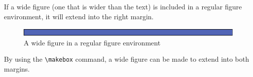 \documentclass{article}
\begin{document}
\Large
If a wide figure (one that is wider than the text) is included in a regular figure environment, it will extend into the right margin.
\begin{figure}[htbp]
  \includegraphics[width=1.2\textwidth]{box.pdf}
  \caption{A wide figure in a regular figure environment}
\end{figure}

By using the \texttt{\textbackslash makebox} command, a wide figure can be made to extend into both margins.\\

\noindent{}
\end{document}
